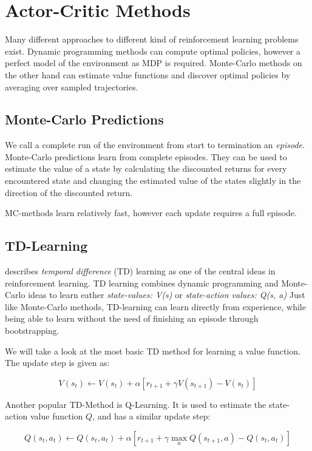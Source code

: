 \section{Actor-Critic Methods}
\raggedbottom 
Many different approaches to different kind of reinforcement learning problems exist. 
Dynamic programming methods can compute optimal policies, however a perfect model of the environment as MDP is required.
Monte-Carlo methods on the other hand can estimate value functions and discover optimal policies by averaging over sampled trajectories.

\subsection{Monte-Carlo Predictions}

We call a complete run of the environment from start to termination an \textit{episode}.
Monte-Carlo predictions learn from complete episodes. They can be used to estimate the value of a state by calculating the discounted returns for every encountered state and changing the estimated value of the states slightly in the direction of the discounted return.

MC-methods learn relatively fast, however each update requires a full episode.

\subsection{TD-Learning}

\cite{Sut98} describes \textit{temporal difference} (TD) learning as one of the central ideas in reinforcement learning.
TD learning combines dynamic programming and Monte-Carlo ideas to learn eather \textit{state-values: V(s)} or \textit{state-action values: Q(s, a)}
Just like Monte-Carlo methods, TD-learning can learn directly from experience, while being able to learn without the need of finishing an episode through bootstrapping.

We will take a look at the most basic TD method for learning a value function. 
The update step is given as:

\begin{equation}
V(s_t)\gets V(s_t)+ \alpha [r_{t+1} + \gamma V(s_{t+1})-V(s_t)]
\end{equation}

Another popular TD-Method is Q-Learning.
It is used to estimate the state-action value function $Q$, and has a similar update step:

\begin{equation}
Q(s_t,a_t)\gets Q(s_t,a_t)+ \alpha [r_{t+1} + \gamma \max_a Q(s_{t+1},a)-Q(s_t,a_t)]
\end{equation}

